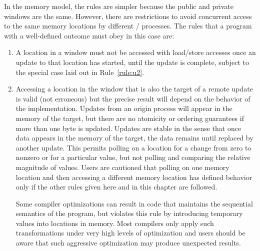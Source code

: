 In the  memory model, the rules are
simpler because the public and private windows are the same.
However, there are restrictions to avoid concurrent access to
the same memory locations by different \mpi/ processes.
The rules that a program with a well-defined outcome must obey in this case are:

\begin{enumerate}
\def\makelabel#1{\hss\llap{U#1}}%
\item\label{rule:u1}
A location in a window must not be accessed
with load/store accesses once an update to
that location has started, until the update is complete, 
subject to the special case laid out in Rule~\ref{rule:u2}.
\item\label{rule:u2}
Accessing a location in the
window that is also the target of a remote update is valid (not
erroneous) but the precise result will depend on the behavior of the
implementation.  Updates from an origin process will appear in the memory of
the target, but there are no atomicity or ordering guarantees
if more than one byte is updated.  Updates are stable in the sense
that once data appears in the memory of the target, the data remains until
replaced by another update.
This permits polling on a location
for a change from zero to nonzero or for a particular value, but not
polling and comparing the relative magnitude of values.
Users are cautioned that polling on one memory location and
then accessing a different memory location has defined behavior only
if the other rules given here and in this chapter are followed.

\begin{users}
Some compiler optimizations can result in code that
maintains the sequential semantics of the program, but violates
this rule
by introducing temporary values into locations in memory.  Most
compilers only apply such transformations under very high levels of
optimization and users should be aware that such aggressive optimization
may produce unexpected results.
\end{users}


\end{enumerate}
